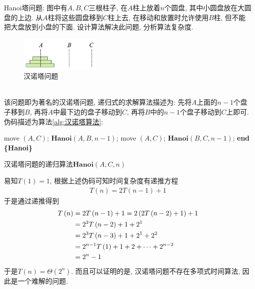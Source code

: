\documentclass{article}
\begin{document}
\begin{homeworkProblem}

	Hanoi塔问题: 图中有$A,B,C$三根柱子, 在$A$柱上放着$n$个圆盘, 其中小圆盘放在大圆盘的上边. 从$A$柱将这些圆盘移到$C$柱上去, 在移动和放置时允许使用$B$柱, 但不能把大盘放到小盘的下面. 设计算法解决此问题, 分析算法复杂度.
	\begin{figure}[H]  %
		\centering
		\includegraphics[width=0.35\textwidth]{images/title/汉诺塔问题.pdf}
		\caption{汉诺塔问题}
		\label{fig:汉诺塔问题}
	\end{figure}

	\solution
	\\

	该问题即为著名的汉诺塔问题, 递归式的求解算法描述为: 先将$A$上面的$n-1$个盘子移到$B$, 再将$A$中最下边的盘子移动到$C$, 再将$B$中的$n-1$个盘子移动到$C$上即可. 伪码描述为算法\ref{alg:汉诺塔算法}:
	\begin{algorithm}[H]
		\begin{algorithmic}[1]
			\State move $(A, C)$;
		\Else
			\State $\textbf{Hanoi}(A, B, n-1)$;
			\State move $(A, C)$;
			\State $\textbf{Hanoi}(B, C, n-1)$;
		\EndIf
		\State \textbf{end \{Hanoi\}}
		\end{algorithmic}
		\caption{汉诺塔问题的递归算法$\textbf{Hanoi}(A, C, n)$}
		\label{alg:汉诺塔算法}
	\end{algorithm}
	易知$T(1)=1$, 根据上述伪码可知时间复杂度有递推方程
	\begin{align}
		T(n) = 2T(n-1)+1
	\end{align}
	于是通过递推得到
	\begin{align}
		T\left( n \right) &=2T\left( n-1 \right) +1=2\left( 2T\left( n-2 \right) +1 \right) +1 \notag
		\\
		&=2^2T\left( n-2 \right) +1+2^1 \notag
		\\
		&=2^3T\left( n-3 \right) +1+2^1+2^2 \notag
		\\
		&=2^{n-1}T\left( 1 \right) +1+2+\cdots +2^{n-2} \notag
		\\
		&=2^n-1 \notag
	\end{align}
	于是$T(n)=\Theta \left(2^n\right)$. 而且可以证明的是, 汉诺塔问题不存在多项式时间算法, 因此是一个难解的问题.
\end{homeworkProblem}
\end{document}
